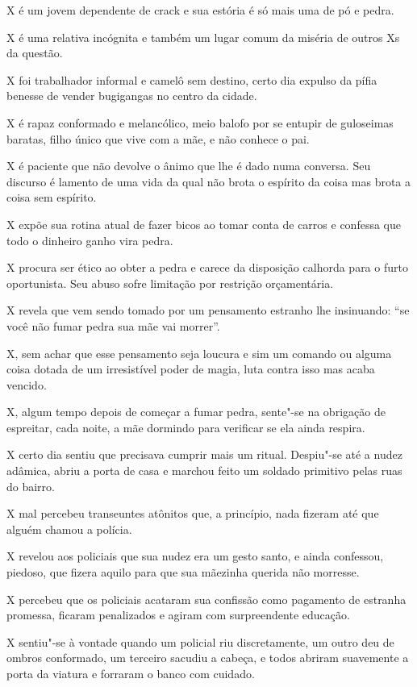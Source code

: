  

X é um jovem dependente de crack e sua estória é só mais uma de pó e
pedra.

X é uma relativa incógnita e também um lugar comum da miséria de outros
Xs da questão.

X foi trabalhador informal e camelô sem destino, certo dia expulso da
pífia benesse de vender bugigangas no centro da cidade.

X é rapaz conformado e melancólico, meio balofo por se entupir de
guloseimas baratas, filho único que vive com a mãe, e não conhece o pai.

X é paciente que não devolve o ânimo que lhe é dado numa conversa. Seu
discurso é lamento de uma vida da qual não brota o espírito da coisa mas
brota a coisa sem espírito.

X expõe sua rotina atual de fazer bicos ao tomar conta de carros e
confessa que todo o dinheiro ganho vira pedra.

X procura ser ético ao obter a pedra e carece da disposição calhorda
para o furto oportunista. Seu abuso sofre limitação por restrição
orçamentária.

X revela que vem sendo tomado por um pensamento estranho lhe insinuando:
``se você não fumar pedra sua mãe vai morrer''.

X, sem achar que esse pensamento seja loucura e sim um comando ou alguma
coisa dotada de um irresistível poder de magia, luta contra isso mas
acaba vencido.

X, algum tempo depois de começar a fumar pedra, sente"-se na obrigação de
espreitar, cada noite, a mãe dormindo para verificar se ela ainda
respira.

X certo dia sentiu que precisava cumprir mais um ritual. Despiu"-se até a
nudez adâmica, abriu a porta de casa e marchou feito um soldado
primitivo pelas ruas do bairro.

X mal percebeu transeuntes atônitos que, a princípio, nada fizeram até
que alguém chamou a polícia.

X revelou aos policiais que sua nudez era um gesto santo, e ainda
confessou, piedoso, que fizera aquilo para que sua mãezinha querida não
morresse.

X percebeu que os policiais acataram sua confissão como pagamento de
estranha promessa, ficaram penalizados e agiram com surpreendente
educação.

X sentiu"-se à vontade quando um policial riu discretamente, um outro deu
de ombros conformado, um terceiro sacudiu a cabeça, e todos abriram
suavemente a porta da viatura e forraram o banco com cuidado.

